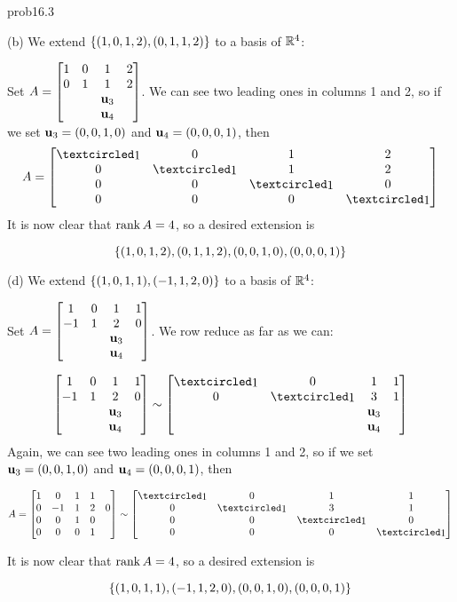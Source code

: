 \begin{sol}{prob16.3}

(b) We extend $\{(1,0,1,2),(0,1,1,2) \}$ to a basis of $\mathbb{R}^4$: \smallskip

Set $A=\left[ \begin{matrix} 1&0&1&2\\0&1&1&2\\ &&\mathbf{u}_3 \\ && \mathbf{u}_4 \end{matrix} \right]$. We can see two leading ones in columns 1 and 2,  so if we set $\mathbf{u}_3=(0,0,1,0)$ and $\mathbf{u}_4=(0,0,0,1)$, then
$$A =\mat{\pivot&0&1&2\\0&\pivot&1&2\\ 0&0&\pivot&0\\ 0&0&0&\pivot}$$ It is now clear that $\operatorname{rank} A=4$, so a desired extension is 

$$ \{(1,0,1,2),(0,1,1,2), (0,0,1,0),(0,0,0,1) \}$$
\medskip

(d) We extend $ \{(1,0,1,1),(-1,1,2,0) \}$ to a basis of $\mathbb{R}^4$:\smallskip

Set $A=\left[ \begin{matrix} 1&0&1&1\\-1&1&2&0\\ &&\mathbf{u}_3 \\ && \mathbf{u}_4 \end{matrix} \right]$. We row reduce as far as we can:

$$\mat{1&0&1&1\\-1&1&2&0\\ &&\uu_3 \\ && \uu_4} \sim \mat{
\pivot&0&1&1\\
0&\pivot&3&1\\ &&\uu_3 \\ && \uu_4} $$ Again, we can see two leading ones in columns 1 and 2,  so if we set $\mathbf{u}_3=(0,0,1,0)$ and $\mathbf{u}_4=(0,0,0,1)$, then

$$A =\mat{1&0&1&1\\0&-1&1&2&0\\ 0&0&1&0\\ 0&0&0&1}\sim \mat{
\pivot&0&1&1\\
0&\pivot&3&1\\ 0&0&\pivot&0 \\ 0&0&0&\pivot} $$ 

It is now clear that $\operatorname{rank} A=4$, so a desired extension is 

$$  \{(1,0,1,1),(-1,1,2,0), (0,0,1,0),(0,0,0,1) \}$$

\end{sol}

